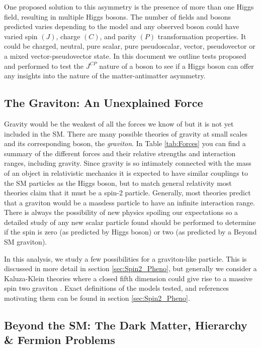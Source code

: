 One proposed solution to this asymmetry is the presence of more than one Higgs field, resulting in multiple Higgs bosons. The number of fields and bosons predicted varies depending to the model and any observed boson could have varied spin $(J)$, charge $(C)$, and parity $(P)$ transformation properties. It could be charged, neutral, pure scalar, pure pseudoscalar, vector, pseudovector or a mixed vector-pseudovector state. In this document we outline tests proposed and performed to test the $J^{CP}$ nature of a boson to see if a Higgs boson can offer any insights into the nature of the matter-antimatter asymmetry.

\subsection{The Graviton: An Unexplained Force}
\label{sec:Graviton}

Gravity would be the weakest of all the forces we know of but it is not yet included in the SM. There are many possible theories of gravity at small scales and its corresponding boson, the \textit{graviton}. In Table \ref{tab:Forces} you can find a summary of the different forces and their relative strengths and interaction ranges, including gravity. Since gravity is so intimately connected with the mass of an object in relativistic mechanics it is expected to have similar couplings to the SM particles as the Higgs boson, but to match general relativity most theories claim that it must be a spin-2 particle. Generally, most theories predict that a graviton would be a massless particle to have an infinite interaction range. There is always the possibility of new physics spoiling our expectations so a detailed study of any new scalar particle found should be performed to determine if the spin is zero (as predicted by Higgs boson) or two (as predicted by a Beyond SM graviton).

In this analysis, we study a few possibilities for a graviton-like particle. This is discussed in more detail in section \ref{sec:Spin2_Pheno}, but generally we consider a Kaluza-Klein theories where a closed fifth dimension could give rise to a massive spin two graviton \cite{Klein:1926fj}. Exact definitions of the models tested, and references motivating them can be found in section \ref{sec:Spin2_Pheno}.


\subsection{Beyond the SM: The Dark Matter, Hierarchy \& Fermion Problems}
\label{sec:BSM}

